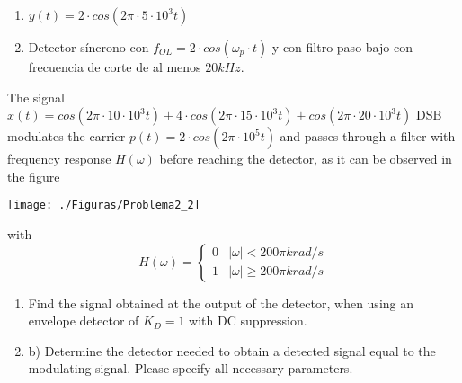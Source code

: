 \documentclass[idioma,boletin]{uah}
\begin{document}
			
	{
		\begin{enumerate}
			\item $y(t)=2\cdot cos(2\pi \cdot 5 \cdot 10^3t)$
			\item Detector síncrono con $f_{OL} = 2 \cdot cos(\omega_p \cdot t)$ y con filtro paso bajo con frecuencia de corte de al menos $20kHz$.
		\end{enumerate}
	}
	{

		The signal $x(t) = cos(2\pi\cdot 10\cdot 10^3 t)+4\cdot cos(2\pi\cdot 15 \cdot10^3 t)+cos(2\pi \cdot 20\cdot10^3 t)$ DSB modulates the carrier $p(t)=2\cdot cos(2\pi \cdot 10^5 t)$ and passes through a filter with frequency response $H(\omega)$ before reaching the detector, as it can be observed in the figure
		{\begin{figure*}[h!]\centering\texttt{[image: ./Figuras/Problema2\_2]}\end{figure*}}
	
	
		with
		\begin{displaymath}
			H(\omega)=\left \{ \begin{array}{ll}
				0 & |\omega|<200\pi krad/s  \\
				1 & |\omega|\geq200\pi krad/s
			\end{array}
			\right.
		\end{displaymath}
	
		\begin{enumerate}
			\item Find the signal obtained at the output of the detector, when using an envelope detector of $K_D=1$ with DC suppression. 
			\item b)	Determine the detector needed to obtain a detected signal equal to the modulating signal. Please specify all necessary parameters.
		\end{enumerate} 
		}
\end{document}
